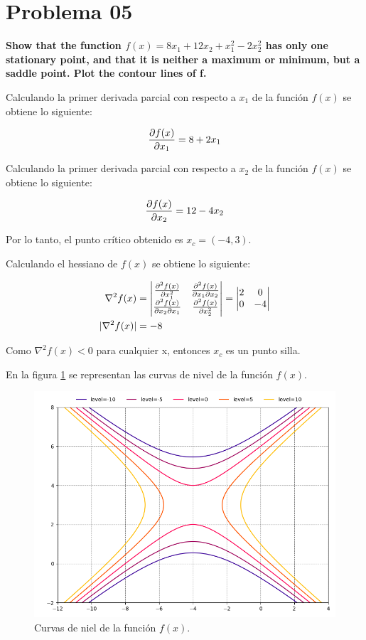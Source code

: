 \section*{Problema 05}

\textbf{Show that the function $f (x) = 8x_1 + 12x_2 + x^2_1 - 2x_2^2$ has only one stationary point, and that it is neither a maximum or minimum, but a saddle point. Plot the contour lines of f.}

Calculando la primer derivada parcial con respecto a $x_1$ de la función $f(x)$ se obtiene lo siguiente:

\begin{equation*}
    \frac{\partial f(x)}{\partial x_1} = 8+2x_1
\end{equation*}

Calculando la primer derivada parcial con respecto a $x_2$ de la función $f(x)$ se obtiene lo siguiente:

\begin{equation*}
    \frac{\partial f(x)}{\partial x_2} = 12-4x_2
\end{equation*}

Por lo tanto, el punto crítico obtenido es $x_c=(-4,3)$.

Calculando el hessiano de $f(x)$ se obtiene lo siguiente:

\begin{align*}
    \nabla^2 f(x)   & = \begin{vmatrix}
        \frac{\partial ^2f(x)}{\partial x_1^2}           & \frac{\partial ^2f(x)}{\partial x_1\partial x_2} \\
        \frac{\partial ^2f(x)}{\partial x_2\partial x_1} & \frac{\partial ^2f(x)}{\partial x_2^2}
    \end{vmatrix} = \begin{vmatrix}
        2 & 0  \\
        0 & -4
    \end{vmatrix} \\
    |\nabla^2 f(x)| & = -8
\end{align*}

Como $\nabla^2 f(x)<0$ para cualquier x, entonces $x_c$ es un punto silla.

En la figura \ref{fig:problem_5} se representan las curvas de nivel de la función $f(x)$.

\begin{figure}[H]
    \centering
    \includegraphics[width=12cm]{Graphics/problem05.png}
    \caption{Curvas de niel de la función $f(x)$.}
    \label{fig:problem_5}
\end{figure}